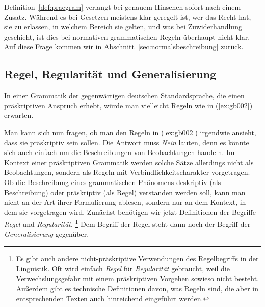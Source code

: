 
Definition~\ref{def:praegram} verlangt bei genauem Hinsehen sofort nach einem Zusatz.
Während es bei Gesetzen meistens klar geregelt ist, wer das Recht hat, sie zu erlassen, in welchem Bereich sie gelten, und was bei Zuwiderhandlung geschieht, ist dies bei normativen grammatischen Regeln überhaupt nicht klar.
Auf diese Frage kommen wir in Abschnitt~\ref{sec:normalsbeschreibung} zurück.

\subsection{Regel, Regularität und Generalisierung}

\label{sec:regulgen}

In einer Grammatik der gegenwärtigen deutschen Standardsprache, die einen präskriptiven Anspruch erhebt, würde man vielleicht Regeln wie in (\ref{ex:gb002}) erwarten.

\begin{exe}
  \ex\label{ex:gb002}
  \begin{xlist}
  \end{xlist}
\end{exe}

Man kann sich nun fragen, ob man den Regeln in (\ref{ex:gb002}) irgendwie ansieht, dass sie präskriptiv sein sollen.
Die Antwort muss \textit{Nein} lauten, denn es könnte sich auch einfach um die Beschreibungen von Beobachtungen handeln.
Im Kontext einer präskriptiven Grammatik werden solche Sätze allerdings nicht als Beobachtungen, sondern als Regeln mit Verbindlichkeitscharakter vorgetragen.
Ob die Beschreibung eines grammatischen Phänomens deskriptiv (als Beschreibung) oder präskriptiv (als Regel) verstanden werden soll, kann man nicht an der Art ihrer Formulierung ablesen, sondern nur an dem Kontext, in dem sie vorgetragen wird.
Zunächst benötigen wir jetzt Definitionen der Begriffe \textit{Regel} und \textit{Regularität}.%
\footnote{Es gibt auch andere nicht-präskriptive Verwendungen des Regelbegriffs in der Linguistik.
Oft wird einfach \textit{Regel} für \textit{Regularität} gebraucht, weil die Verwechslungsgefahr mit einem präskriptiven Vorgehen sowieso nicht besteht.
Außerdem gibt es technische Definitionen davon, was Regeln sind, die aber in entsprechenden Texten auch hinreichend eingeführt werden.}
Dem Begriff der Regel steht dann noch der Begriff der \textit{Generalisierung} gegenüber.

